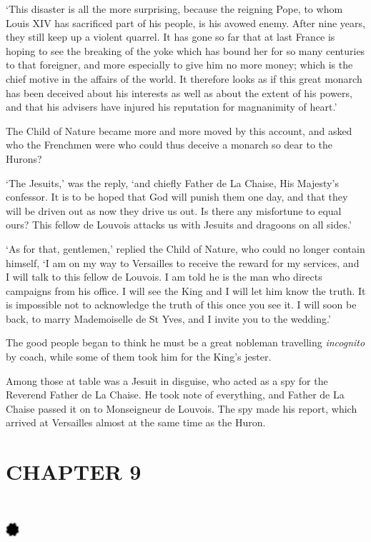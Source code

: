 \documentclass{article}
\begin{document}
\begin{center}
`This disaster is all the more surprising, because the reigning Pope, to whom Louis 
XIV has sacrificed part of his people, is his avowed enemy. After nine years, they 
still keep up a violent quarrel. It has gone so far that at last France is hoping 
to see the breaking of the yoke which has bound her for so many centuries to that 
foreigner, and more especially to give him no more money; which is the chief motive 
in the affairs of the world. It therefore looks as if this great monarch has been 
deceived about his interests as well as about the extent of his powers, and that 
his advisers have injured his reputation for magnanimity of heart.' 

The Child of Nature became more and more moved by this account, and asked who the 
Frenchmen were who could thus deceive a monarch so dear to the Hurons? 

`The Jesuits,' was the reply, `and chiefly Father de La Chaise, His Majesty's confessor. 
It is to be hoped that God will punish them one day, and that they will be driven 
out as now they drive us out. Is there any misfortune to equal ours? This fellow 
de Louvois attacks us with Jesuits and dragoons on all sides.' 

`As for that, gentlemen,' replied the Child of Nature, who could no longer contain 
himself, `I am on my way to Versailles to receive the reward for my services, and 
I will talk to this fellow de Louvois. I am told he is the man who directs campaigns 
from his office. I will see the King and I will let him know the truth. It is impossible 
not to acknowledge the truth of this once you see it. I will soon be back, to marry 
Mademoiselle de St Yves, and I invite you to the wedding.' 

The good people began to think he must be a great nobleman travelling \textit{incognito} 
by coach, while some of them took him for the King's jester. 

Among those at table was a Jesuit in disguise, who acted as a spy for the Reverend 
Father de La Chaise. He took note of everything, and Father de La Chaise passed 
it on to Monseigneur de Louvois. The spy made his report, which arrived at Versailles 
almost at the same time as the Huron.\pagebreak{} 

\section*{\textbf{CHAPTER 9  }}

\section*{%
\includegraphics[width=14pt, height=15pt, keepaspectratio=true]{Zadig or L'Ingenu - Voltaire-fig031.jpg}
}


\end{center}
\end{document}
